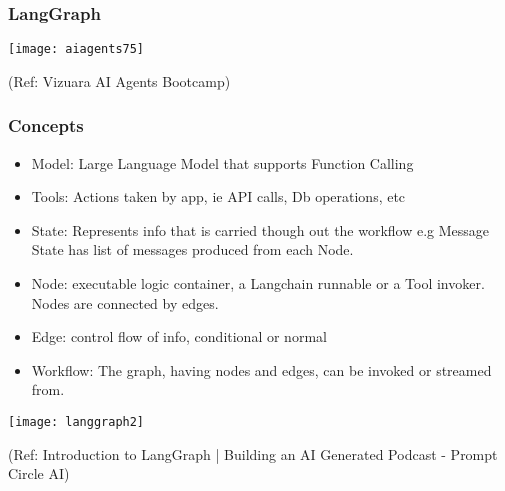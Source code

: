 \begin{frame}[fragile]\frametitle{LangGraph}

        \begin{center}

        \texttt{[image: aiagents75]}
		
		{\tiny (Ref: Vizuara AI Agents Bootcamp)}
				
        \end{center}    

\end{frame}


\begin{frame}\frametitle{Concepts}

\begin{itemize}
\item Model: Large Language Model that supports Function Calling
\item Tools: Actions taken by app, ie API calls, Db operations, etc
\item State: Represents info that is carried though out the workflow e.g Message State has list of messages produced from each Node.
\item Node: executable logic container, a Langchain runnable or a Tool invoker. Nodes are connected by edges.
\item Edge: control flow of info, conditional or normal
\item Workflow: The graph, having nodes and edges, can be invoked or streamed from.
\end{itemize}

\begin{center}
\texttt{[image: langgraph2]}
\end{center}	  

{\tiny (Ref: Introduction to LangGraph | Building an AI Generated Podcast - Prompt Circle AI)}
\end{frame}

